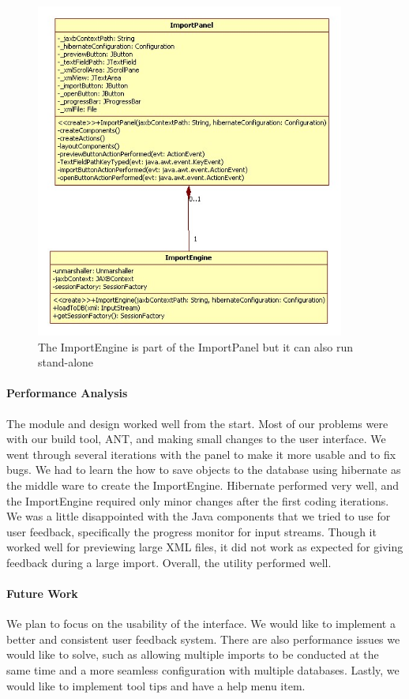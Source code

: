 \begin{figure}[h]
	\centering
		\includegraphics[width=4.00in]{Images/ImportClasses.jpg}
	\caption{The ImportEngine is part of the ImportPanel but it can also run stand-alone}
	\label{fig:ImportClasses}
\end{figure}

\paragraph{Performance Analysis}
The module and design worked well from the start. Most of our problems were with our build tool, ANT, and making small changes to the user interface. We went through several iterations with the panel to make it more usable and to fix bugs. We had to learn the how to save objects to the database using hibernate as the middle ware to create the ImportEngine. Hibernate performed very well, and the ImportEngine required only minor changes after the first coding iterations. We was a little disappointed with the Java components that we tried to use for user feedback, specifically the progress monitor for input streams. Though it worked well for previewing large XML files, it did not work as expected for giving feedback during a large import. Overall, the utility performed well. 

\paragraph{Future Work}
We plan to focus on the usability of the interface. We would like to implement a better and consistent user feedback system. There are also performance issues we would like to solve, such as allowing multiple imports to be conducted at the same time and a more seamless configuration with multiple databases. Lastly, we would like to implement tool tips and have a help menu item. 

